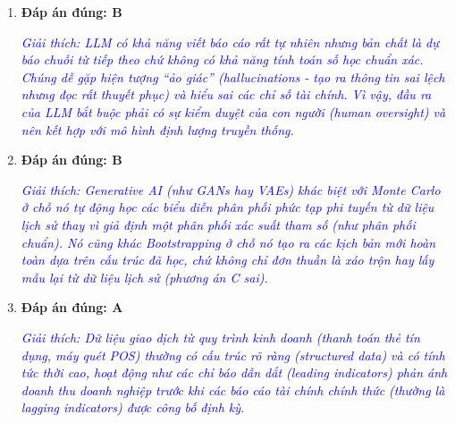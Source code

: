 \begin{enumerate}
	\item \textbf{Đáp án đúng: B}
	      
	      \textcolor{blue}{\textit{Giải thích: LLM có khả năng viết báo cáo rất tự nhiên nhưng bản chất là dự báo chuỗi từ tiếp theo chứ không có khả năng tính toán số học chuẩn xác. Chúng dễ gặp hiện tượng ``ảo giác'' (hallucinations - tạo ra thông tin sai lệch nhưng đọc rất thuyết phục) và hiểu sai các chỉ số tài chính. Vì vậy, đầu ra của LLM bắt buộc phải có sự kiểm duyệt của con người (human oversight) và nên kết hợp với mô hình định lượng truyền thống.}}
	      
	\item \textbf{Đáp án đúng: B}
	      
	      \textcolor{blue}{\textit{Giải thích: Generative AI (như GANs hay VAEs) khác biệt với Monte Carlo ở chỗ nó tự động học các biểu diễn phân phối phức tạp phi tuyến từ dữ liệu lịch sử thay vì giả định một phân phối xác suất tham số (như phân phối chuẩn). Nó cũng khác Bootstrapping ở chỗ nó tạo ra các kịch bản mới hoàn toàn dựa trên cấu trúc đã học, chứ không chỉ đơn thuần là xáo trộn hay lấy mẫu lại từ dữ liệu lịch sử (phương án C sai).}}
	      
	\item \textbf{Đáp án đúng: A}
	      
	      \textcolor{blue}{\textit{Giải thích: Dữ liệu giao dịch từ quy trình kinh doanh (thanh toán thẻ tín dụng, máy quét POS) thường có cấu trúc rõ ràng (structured data) và có tính tức thời cao, hoạt động như các chỉ báo dẫn dắt (leading indicators) phản ánh doanh thu doanh nghiệp trước khi các báo cáo tài chính chính thức (thường là lagging indicators) được công bố định kỳ.}}
\end{enumerate}
